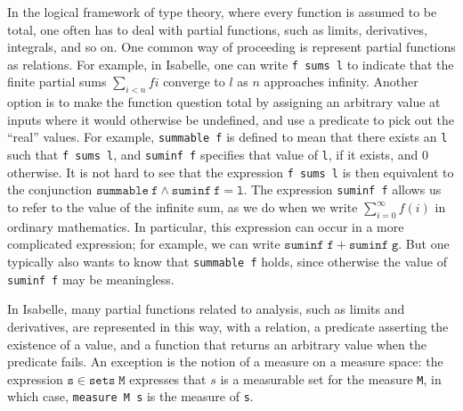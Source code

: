\documentclass{svjour3}
\begin{document}
In the logical framework of type theory, where every function is assumed to be total, one often has to deal with partial functions, such as limits, derivatives, integrals, and so on. One common way of proceeding is represent partial functions as relations. For example, in Isabelle, one can write \texttt{f~sums~l} to indicate that the finite partial sums $\sum_{i < n} f i$ converge to $l$ as $n$ approaches infinity. Another option is to make the function question total by assigning an arbitrary value at inputs where it would otherwise be undefined, and use a predicate to pick out the ``real'' values. For example, \texttt{summable f} is defined to mean that there exists an \texttt{l} such that \texttt{f sums l}, and \texttt{suminf f} specifies that value of \texttt{l}, if it exists, and $0$ otherwise. It is not hard to see that the expression \texttt{f sums l} is then equivalent to the conjunction $\mathtt{summable~f} \wedge \mathtt{suminf~f } = \mathtt{l}$. The expression \texttt{suminf f} allows us to refer to the value of the infinite sum, as we do when we write $\sum_{i = 0}^\infty f(i)$ in ordinary mathematics. In particular, this expression can occur in a more complicated expression; for example, we can write $\mathtt{suminf \; f} + \mathtt{suminf \; g}$. But one typically also wants to know that \texttt{summable f} holds, since otherwise the value of \texttt{suminf f} may be meaningless.

In Isabelle, many partial functions related to analysis, such as limits and derivatives, are represented in this way, with a relation, a predicate asserting the existence of a value, and a function that returns an arbitrary value when the predicate fails. An exception is the notion of a measure on a measure space: the expression $\mathtt{s} \in \mathtt{sets \; M}$ expresses that $s$ is a measurable set for the measure \texttt{M}, in which case, \texttt{measure M s} is the measure of \texttt{s}.
\end{document}
